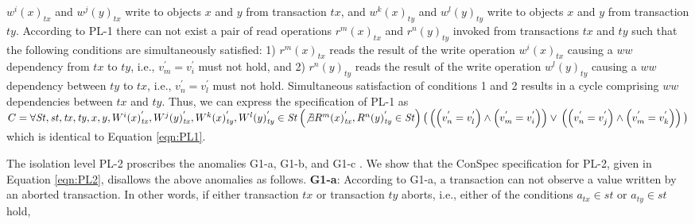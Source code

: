 \documentclass{sig-alternate-05-2015}
\begin{document}
 $w^i(x)_\mathit{tx}$ and $w^j(y)_\mathit{tx}$ write to objects $x$ and $y$ from transaction $\mathit{tx}$, and
 $w^k(x)_\mathit{ty}$ and $w^l(y)_\mathit{ty}$ write to objects $x$ and $y$ from transaction $\mathit{ty}$.
 According to PL-1 there can not exist a pair of read operations $r^m(x)_\mathit{tx}$ and $r^n(y)_\mathit{ty}$
 invoked from transactions  $\mathit{tx}$ and $\mathit{ty}$  such that the following conditions are simultaneously
 satisfied: 1) $r^m(x)_\mathit{tx}$ reads the result of the
 write operation $w^i(x)_\mathit{tx}$ causing a $ww$ dependency from  $\mathit{tx}$ to $\mathit{ty}$, i.e.,
 $v_m^{'} = v_i^{'}$ must not hold, and 2)
  $r^n(y)_\mathit{ty}$ reads the result of the
 write operation $w^l(y)_\mathit{ty}$ causing a $ww$ dependency between  $\mathit{ty}$ to $\mathit{tx}$, i.e.,
 $v_n^{'} = v_l^{'} $ must not hold. Simultaneous
 satisfaction of conditions 1 and 2 results in a cycle comprising $ww$ dependencies between $\mathit{tx}$ and $\mathit{ty}$.
 Thus, we can express the specification of PL-1 as
$C = \forall \mathit{St}, \mathit{st}, \mathit{tx}, \mathit{ty}, x, y,
  {W^i}(x)^{'}_\mathit{tx},  {W^j}(y)^{'}_\mathit{tx},
  {W^k}(x)^{'}_\mathit{ty}, {W^l}(y)^{'}_\mathit{ty} \in  \mathit{St} \\
  \left( \not\exists {R^m}(x)^{'}_\mathit{tx}, {R^n}(y)^{'}_\mathit{ty} \in \mathit{St} \right)
\big( \left( \left( v_n^{'} = v_l^{'} \right) \wedge \left( v_m^{'} = v_i^{'} \right) \right) \vee \\
\left( \left( v_n^{'} = v_j^{'} \right) \wedge \left( v_m^{'} = v_k^{'} \right) \right)  \big)$
 which is identical to Equation \ref{eqn:PL1}. %
\par The isolation level PL-2 proscribes the anomalies G1-a, G1-b, and G1-c \cite{DBLP:conf/icde/AdyaLO00}. We show that
the ConSpec specification for PL-2, given in Equation \ref{eqn:PL2}, disallows the above anomalies as follows.
\textbf{G1-a}: According to G1-a, a transaction can not observe a value written by an aborted transaction.
 In other words, if either transaction  $\mathit{tx}$ or transaction $\mathit{ty}$ aborts, i.e., either of the conditions $a_\mathit{tx} \in \mathit{st}$ or $a_\mathit{ty} \in \mathit{st}$ hold,
\end{document}
